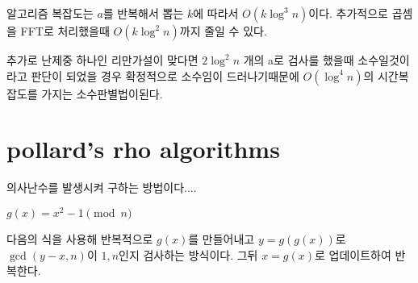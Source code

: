 알고리즘 복잡도는 $a$를 반복해서 뽑는 $k$에 따라서 $O(k \log^3 n)$이다. 추가적으로 곱셈을 FFT로 처리했을때 $O(k \log^2 n)$까지 줄일 수 있다.

추가로 난제중 하나인 리만가설이 맞다면 $2\log^2 n$ 개의 a로 검사를 했을때 소수일것이라고 판단이 되었을 경우 확정적으로 소수임이 드러나기때문에 $O(\log^4 n)$의 시간복잡도를 가지는 소수판별법이된다.

\section{pollard's rho algorithms}

의사난수를 발생시켜 구하는 방법이다....


$ g(x)  = x ^2-1 \pmod{n} $

다음의 식을 사용해 반복적으로 $g(x)$를 만들어내고 
$y = g(g(x))$로 $\gcd(y-x, n)$이 $1,n$인지 검사하는 방식이다. 그뒤 $x = g(x)$로 업데이트하여 반복한다.


